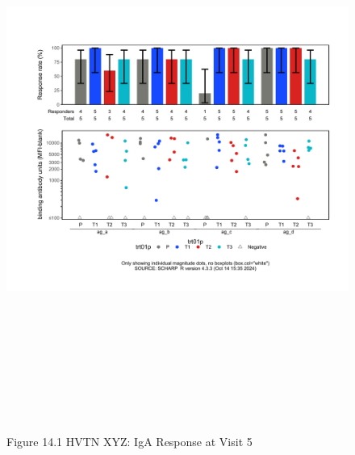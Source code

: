 \documentclass[12pt]{article}
\begin{document}
\begin{figure}[H]

{\centering \includegraphics[width=8.75in,height=7.25in]{test_cases_files/figure-latex/unnamed-chunk-28-1} 

}

\caption[Figure 14.1 boxplot (pos. response boxplots)]{Figure 14.1 HVTN XYZ: IgA Response at Visit 5}\label{fig:unnamed-chunk-28}
\end{figure}
\clearpage
\end{document}
